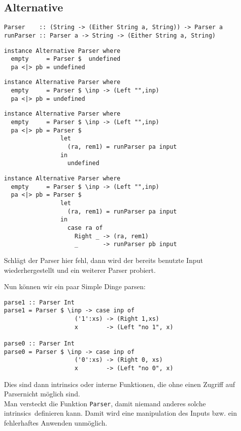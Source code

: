 \documentclass{beamer}
\begin{document}
\subsection{Alternative}
\begin{frame}[fragile]
\begin{verbatim}
Parser    :: (String -> (Either String a, String)) -> Parser a
runParser :: Parser a -> String -> (Either String a, String)
\end{verbatim}
\begin{overprint}
\begin{verbatim}
instance Alternative Parser where
  empty     = Parser $  undefined
  pa <|> pb = undefined
\end{verbatim}
\begin{verbatim}
instance Alternative Parser where
  empty     = Parser $ \inp -> (Left "",inp)
  pa <|> pb = undefined
\end{verbatim}
\begin{verbatim}
instance Alternative Parser where
  empty     = Parser $ \inp -> (Left "",inp)
  pa <|> pb = Parser $  
                let
                  (ra, rem1) = runParser pa input
                in
                  undefined
\end{verbatim}
\begin{verbatim}
instance Alternative Parser where
  empty     = Parser $ \inp -> (Left "",inp)
  pa <|> pb = Parser $  
                let
                  (ra, rem1) = runParser pa input
                in
                  case ra of
                    Right _ -> (ra, rem1)
                    _       -> runParser pb input
\end{verbatim}
Schlägt der Parser hier fehl, dann wird der bereits benutzte Input wiederhergestellt und ein weiterer Parser probiert.
\end{overprint}
\end{frame}

\begin{frame}[fragile]
Nun können wir ein paar Simple Dinge parsen:
\begin{verbatim}
parse1 :: Parser Int
parse1 = Parser $ \inp -> case inp of
                    ('1':xs) -> (Right 1,xs)
                    x        -> (Left "no 1", x)

parse0 :: Parser Int
parse0 = Parser $ \inp -> case inp of
                    ('0':xs) -> (Right 0, xs)
                    x        -> (Left "no 0", x)
\end{verbatim}
\pause
Dies sind dann intrinsics oder interne Funktionen, die ohne einen Zugriff auf \glqq Parser\grqq nicht möglich sind.\\
\pause
Man versteckt die Funktion \texttt{Parser}, damit niemand anderes solche \glqq intrinsics\grqq \ definieren kann. Damit wird eine manipulation des Inputs bzw. ein fehlerhaftes Anwenden unmöglich.
\end{frame}
\end{document}
